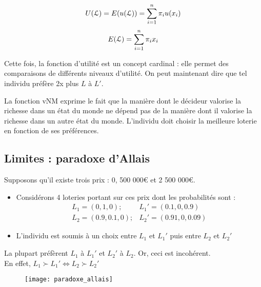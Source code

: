 \begin{equation*}
U(\operatorname{\mathcal{L}}) = E(u(\operatorname{\mathcal{L}})) = \sum_{i=1}^{n} \pi_i u(x_i)
\end{equation*}
\begin{equation*}
E(\operatorname{\mathcal{L}}) = \sum_{i=1}^{n} \pi_i x_i
\end{equation*}

Cette fois, la fonction d'utilité est un concept cardinal : elle permet des comparaisons de différents niveaux d'utilité. On peut maintenant dire que tel individu préfère 2x plus $L$ à $L'$.

La fonction vNM exprime le fait que la manière dont le décideur valorise la richesse dans un état du monde ne dépend pas de la manière dont il valorise la richesse dans un autre état du monde. L'individu doit choisir la meilleure loterie en fonction de ses préférences.

\newpage
\subsection{Limites : paradoxe d'Allais}

Supposons qu'il existe trois prix : 0, 500 000€ et 2 500 000€.
\begin{itemize}
\item Considérons 4 loteries portant sur ces prix dont les probabilités sont :
	\begin{align*}
	L_1 = (0, 1, 0); &L_1' = (0.1, 0, 0.9)\\
	L_2 = (0.9, 0.1, 0); &L_2' = (0.91, 0, 0.09)
	\end{align*}
\item L'individu est soumis à un choix entre $L_1$ et $L_1'$ puis entre $L_2$ et $L_2'$
\end{itemize}

\begin{minipage}{0.65\textwidth}
	La plupart préfèrent $L_1$ à $L_1'$ et $L_2'$ à $L_2$. Or, ceci est incohérent.\\
	En effet, $L_1 \succ L_1' \Leftrightarrow L_2 \succ L_2'$
\end{minipage}
\begin{minipage}{0.3\textwidth}
	\begin{figure}[H]
		\centering
		\texttt{[image: paradoxe\_allais]}
	\end{figure}
\end{minipage}

